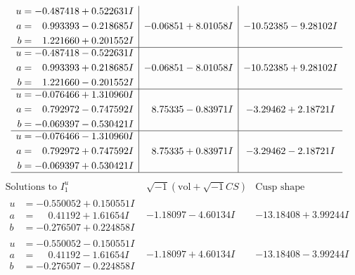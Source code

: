 \documentclass[1p]{elsarticle_modified}
\theoremstyle{definition}
\newcommand{\I}{\sqrt{-1}}
\begin{document}
$$\begin{array}{c|c|c}
\begin{aligned}
u &= -0.487418 + 0.522631 I \\
a &= \phantom{-}0.993393 - 0.218685 I \\
b &= \phantom{-}1.221660 + 0.201552 I\end{aligned}
 & -0.06851 + 8.01058 I & -10.52385 - 9.28102 I \\ \hline\begin{aligned}
u &= -0.487418 - 0.522631 I \\
a &= \phantom{-}0.993393 + 0.218685 I \\
b &= \phantom{-}1.221660 - 0.201552 I\end{aligned}
 & -0.06851 - 8.01058 I & -10.52385 + 9.28102 I \\ \hline\begin{aligned}
u &= -0.076466 + 1.310960 I \\
a &= \phantom{-}0.792972 - 0.747592 I \\
b &= -0.069397 - 0.530421 I\end{aligned}
 & \phantom{-}8.75335 - 0.83971 I & -3.29462 + 2.18721 I \\ \hline\begin{aligned}
u &= -0.076466 - 1.310960 I \\
a &= \phantom{-}0.792972 + 0.747592 I \\
b &= -0.069397 + 0.530421 I\end{aligned}
 & \phantom{-}8.75335 + 0.83971 I & -3.29462 - 2.18721 I\\
 \hline 
 \end{array}$$\newpage$$\begin{array}{c|c|c}  
\text{Solutions to }I^u_{1}& \I (\text{vol} + \sqrt{-1}CS) & \text{Cusp shape}\\
 \hline 
\begin{aligned}
u &= -0.550052 + 0.150551 I \\
a &= \phantom{-}0.41192 + 1.61654 I \\
b &= -0.276507 + 0.224858 I\end{aligned}
 & -1.18097 - 4.60134 I & -13.18408 + 3.99244 I \\ \hline\begin{aligned}
u &= -0.550052 - 0.150551 I \\
a &= \phantom{-}0.41192 - 1.61654 I \\
b &= -0.276507 - 0.224858 I\end{aligned}
 & -1.18097 + 4.60134 I & -13.18408 - 3.99244 I \\ \hline\begin{aligned}

\end{aligned}
\end{array}$$
\end{document}
